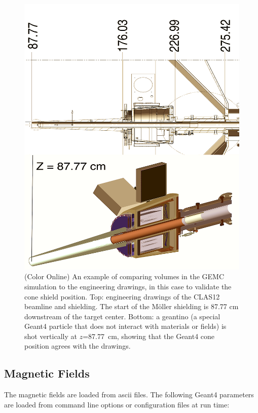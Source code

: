 \begin{figure}
	\centering
	\includegraphics[width=0.99\columnwidth,keepaspectratio]{img/cadValidationExample.png}
	\caption{(Color Online) An example of comparing volumes in the GEMC simulation to the engineering drawings, in this case to validate the cone shield
             position. Top: engineering drawings of the CLAS12 beamline and shielding. The start of the M\"oller shielding is 87.77 cm downstream
             of the target center. Bottom: a geantino (a special Geant4 particle that does not interact with materials or fields)
             is shot vertically at $z$=87.77~cm, showing that the Geant4 cone position agrees with the drawings.}
	\label{fig:cadValidationExample}
\end{figure}



\subsection{Magnetic Fields}
The magnetic fields are loaded from ascii files. The following Geant4 parameters are loaded from
command line options or configuration files at run time:

